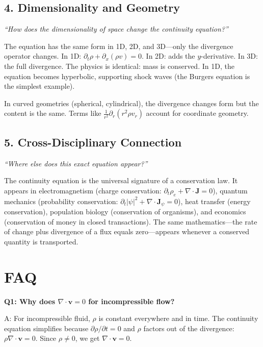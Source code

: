 \subsection*{4. Dimensionality and Geometry}
\textit{``How does the dimensionality of space change the continuity equation?''}

The equation has the same form in 1D, 2D, and 3D---only the divergence operator changes. In 1D: $\partial_t \rho + \partial_x (\rho v) = 0$. In 2D: adds the $y$-derivative. In 3D: the full divergence. The physics is identical: mass is conserved. In 1D, the equation becomes hyperbolic, supporting shock waves (the Burgers equation is the simplest example).

In curved geometries (spherical, cylindrical), the divergence changes form but the content is the same. Terms like $\frac{1}{r^2}\partial_r(r^2 \rho v_r)$ account for coordinate geometry.

\subsection*{5. Cross-Disciplinary Connection}
\textit{``Where else does this exact equation appear?''}

The continuity equation is the universal signature of a conservation law. It appears in electromagnetism (charge conservation: $\partial_t \rho_e + \nabla \cdot \mathbf{J} = 0$), quantum mechanics (probability conservation: $\partial_t |\psi|^2 + \nabla \cdot \mathbf{J}_\psi = 0$), heat transfer (energy conservation), population biology (conservation of organisms), and economics (conservation of money in closed transactions). The same mathematics---the rate of change plus divergence of a flux equals zero---appears whenever a conserved quantity is transported.


\section*{FAQ}

\textbf{Q1: Why does $\nabla \cdot \mathbf{v} = 0$ for incompressible flow?}

A: For incompressible fluid, $\rho$ is constant everywhere and in time. The continuity equation simplifies because $\partial\rho/\partial t = 0$ and $\rho$ factors out of the divergence: $\rho \nabla \cdot \mathbf{v} = 0$. Since $\rho \neq 0$, we get $\nabla \cdot \mathbf{v} = 0$.

